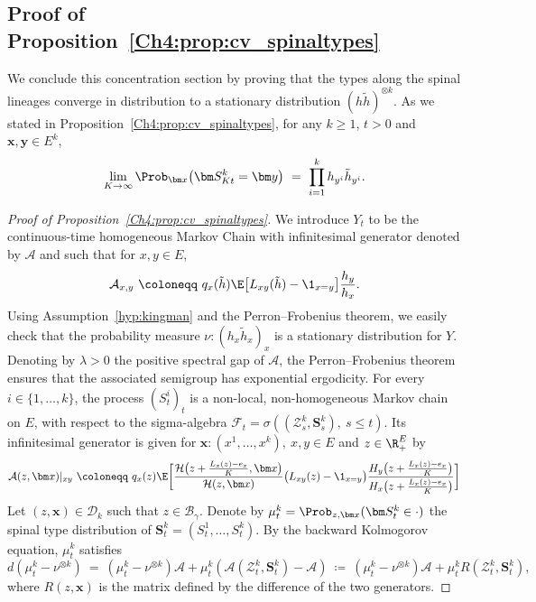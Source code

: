 \begin{refsegment}
\subsection{Proof of Proposition~\ref{Ch4:prop:cv_spinaltypes}}\label{Ch4:sec:cv_spine}
We conclude this concentration section by proving that the types along the spinal lineages converge in distribution to a stationary distribution $(h\tilde h)^{\otimes k}$. 
As we stated in Proposition~\ref{Ch4:prop:cv_spinaltypes}, for any $k\geq 1$, $t>0$ and $\bm x,\bm y\in E^k$,
 \[
\lim_{K\to\infty}\Prob_{\bm x}\big( \bm S^k_{Kt}= \bm y\big)\ =\ \prod_{i=1}^k h_{y^i}\tilde h_{y^i}.
 \]

\begin{proof}[Proof of Proposition~\ref{Ch4:prop:cv_spinaltypes}]
We introduce $Y_t$ to be the continuous-time homogeneous Markov Chain with infinitesimal generator denoted by $\mathcal{A}$ and such that for $x, y\in E$,
\begin{equation*}
  \mathcal{A}_{x,y} \ \coloneqq\ q_x(\tilde h) \E\big[L_{xy}(\tilde h)-\1_{x=y}\big]\frac{h_y}{h_x}.
\end{equation*}
Using Assumption~\ref{hyp:kingman} and the Perron--Frobenius theorem, we  easily check that the probability measure $\nu:(h_x\tilde h_x)_x$ is a stationary distribution for $Y$. Denoting by $\lambda>0$ the positive spectral gap of $\mathcal{A}$, the Perron--Frobenius theorem ensures that the associated semigroup has exponential ergodicity.
For every $i\in\{1,\ldots, k\}$, the process $(S^{i}_{t})_t$ is a non-local, non-homogeneous Markov chain on $E$, with respect to the sigma-algebra $\mathcal{F}_t=\sigma( (\mathcal{Z}^k_s, \bm S^k_s),\  s\leq t)$.
Its infinitesimal generator is given for $\bm x: (x^1,\ldots, x^k),\ x, y\in E$ and $z\in \R_+^E$ by
\[
\mathcal{A}(z, \bm x)|_{xy}\ \coloneqq\ q_x(z)\E\bigg[ \frac{\mathcal{H}\big(z+ \frac{L_x(z)-e_{x}}{K}, \bm x\big)}{\mathcal{H}(z,\bm x)} \big(L_{xy}(z)-\1_{x=y}\big) \frac{  H_{y}\big(z+ \frac{L_x(z)-e_{x}}{K}\big)}{H_{x}\big(z+ \frac{L_x(z)-e_{x}}{K}\big)}\bigg]
\]
Let $(z,\bm x)\in\mathscr{D}_k$ such that $z\in\mathscr{B}_\gamma$. 
Denote by $\mu^k_t=\Prob_{z,\bm x}(\bm S^k_t\in \cdot)$ the spinal type distribution of $\bm S^k_t=(S^{1}_t,\ldots, S^k_t)$.
By the backward Kolmogorov equation, $\mu^k_t$ satisfies
\[
d(\mu^k_t - \nu^{\otimes k})\ =\  (\mu^k_t- \nu^{\otimes k} )\mathcal{A} + \mu^k_t(\mathcal{A}(\mathcal{Z}^k_t, \bm S^k_t)- \mathcal{A})\ \coloneqq\ (\mu^k_t- \nu^{\otimes k} )\mathcal{A} + \mu^k_t R( \mathcal{Z}^k_t, \bm S^k_t),
\]
where $R(z,\bm x)$ is the matrix defined by the difference of the two generators.


\end{proof}
\end{refsegment}
